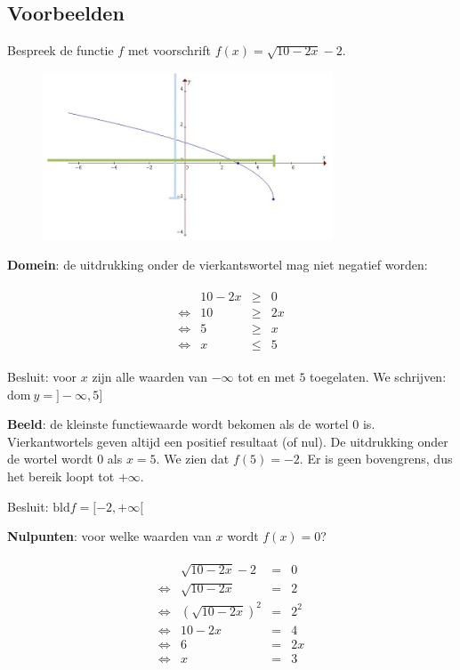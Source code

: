 \subsection{Voorbeelden}



\begin{voorbeeld}
	Bespreek de functie $f$ met voorschrift $f(x)=\sqrt{10-2x}-2$.

\begin{figure}[h]
	\centering{}\includegraphics[height=5cm]{2_elem_rekenvaardigheden_B/inputs/reeel_vb1.jpg} 
\end{figure}


\textbf{Domein}: de uitdrukking onder de vierkantswortel
mag niet negatief worden:


\begin{eqnarray*}
	\begin{array}{cccc}
		& 10-2x & \geqslant & 0\\
		\iff & 10 & \geqslant & 2x\\
		\iff & 5 & \geqslant & x\\
		\iff & x & \leqslant & 5
	\end{array}
\end{eqnarray*}


Besluit: voor $x$ zijn alle waarden van $-\infty$ tot
en met $5$ toegelaten. We schrijven: $\textrm{dom}\:y=]-\infty,5]$ 

\textbf{Beeld}: de kleinste functiewaarde wordt
bekomen als de wortel $0$ is. Vierkantwortels geven altijd een positief
resultaat (of nul). De uitdrukking onder de wortel wordt $0$ als
$x=5$. We zien dat $f(5)=-2$. Er is geen bovengrens, dus het bereik
loopt tot $+\infty$.

Besluit: $\textrm{bld}f=[-2,+\infty[$




\textbf{Nulpunten}: voor welke waarden van $x$ wordt $f(x)=0$?


\begin{eqnarray*}
	\begin{array}{cccc}
		& \sqrt{10-2x}-2 & = & 0\\
		\iff & \sqrt{10-2x} & = & 2\\
		\iff & \left(\sqrt{10-2x}\right)^{2} & = & 2^{2}\\
		\iff & 10-2x & = & 4\\
		\iff & 6 & = & 2x\\
		\iff & x & = & 3
	\end{array}
\end{eqnarray*}



\end{voorbeeld}
